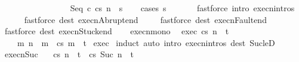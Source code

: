 \begin{isabellebody}
\ \ \ \ \ \ \ \ {\isasymLongrightarrow}\isanewline
\ \ \ \ \ \ \ \ {\isasymGamma}{\isasymturnstile}{\isasymlangle}Seq\ c{}\ c{}{\isacharcomma}s{\isasymrangle}\ {\isacharequal}n{\isasymRightarrow}\ \ s{\isacharprime}{\isacharprime}{\isachardoublequoteclose}\isanewline
%
\isadelimproof
\ \ %
\endisadelimproof
%
\isatagproof
{}\isamarkupfalse%
\ {\isacharparenleft}cases\ s{\isacharparenright}\isanewline
\ \ \isamarkupfalse%
\ \ \ \ {\isacharparenleft}fastforce\ intro{\isacharcolon}\ execn{\isachardot}intros{\isacharparenright}\isanewline
\ \ \isamarkupfalse%
\ \ \ {\isacharparenleft}fastforce\ dest{\isacharcolon}\ execn{\isacharunderscore}Abrupt{\isacharunderscore}end{\isacharparenright}\isanewline
\ \ \isamarkupfalse%
\ \ {\isacharparenleft}fastforce\ dest{\isacharcolon}\ execn{\isacharunderscore}Fault{\isacharunderscore}end{\isacharparenright}\isanewline
\ \ \isamarkupfalse%
\ {\isacharparenleft}fastforce\ dest{\isacharcolon}\ execn{\isacharunderscore}Stuck{\isacharunderscore}end{\isacharparenright}\isanewline
\ \ \isamarkupfalse%
%
\endisatagproof
{\isafoldproof}%
%
\isadelimproof
\isanewline
%
\endisadelimproof
\isanewline
{}\isamarkupfalse%
\ execn{\isacharunderscore}mono{\isacharcolon}\isanewline
\ \ exec{\isacharcolon}\ {\isachardoublequoteopen}{\isasymGamma}{\isasymturnstile}{\isasymlangle}c{\isacharcomma}s{\isasymrangle}\ {\isacharequal}n{\isasymRightarrow}\ \ t{\isachardoublequoteclose}\isanewline
\ \ \ {\isachardoublequoteopen}{\isasymAnd}\ m{\isachardot}\ n\ {\isasymle}\ m\ {\isasymLongrightarrow}\ {\isasymGamma}{\isasymturnstile}{\isasymlangle}c{\isacharcomma}s{\isasymrangle}\ {\isacharequal}m{\isasymRightarrow}\ \ t{\isachardoublequoteclose}\isanewline
%
\isadelimproof
%
\endisadelimproof
%
\isatagproof
{}\isamarkupfalse%
\ exec\isanewline
{}\isamarkupfalse%
\ {\isacharparenleft}induct{\isacharparenright}\ {\isacharparenleft}auto\ intro{\isacharcolon}\ execn{\isachardot}intros\ dest{\isacharcolon}\ Suc{\isacharunderscore}le{\isacharunderscore}D{\isacharparenright}%
\endisatagproof
{\isafoldproof}%
%
\isadelimproof
\isanewline
%
\endisadelimproof
\isanewline
\isanewline
{}\isamarkupfalse%
\ execn{\isacharunderscore}Suc{\isacharcolon}\ \isanewline
\ \ {\isachardoublequoteopen}{\isasymGamma}{\isasymturnstile}{\isasymlangle}c{\isacharcomma}s{\isasymrangle}\ {\isacharequal}n{\isasymRightarrow}\ \ t\ {\isasymLongrightarrow}\ {\isasymGamma}{\isasymturnstile}{\isasymlangle}c{\isacharcomma}s{\isasymrangle}\ {\isacharequal}Suc\ n{\isasymRightarrow}\ \ t{\isachardoublequoteclose}\isanewline

\end{isabellebody}
